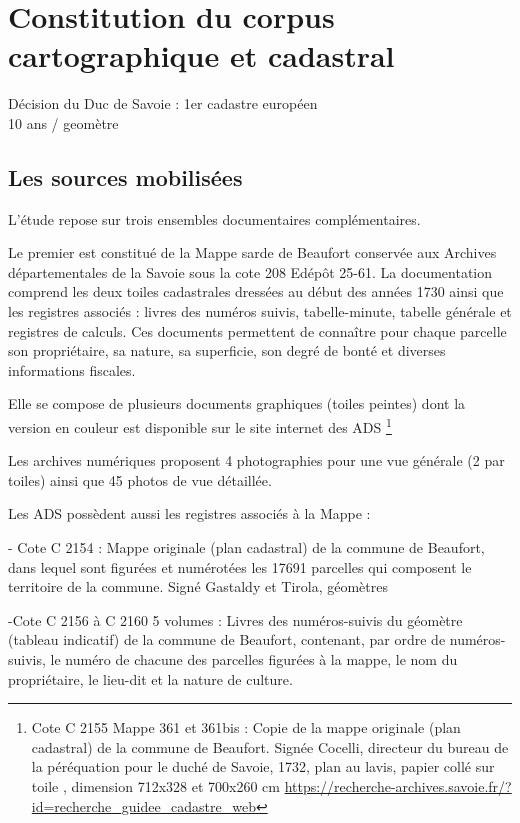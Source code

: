 \documentclass[12pt,a4paper]{report}
\begin{document}
	
\chapter{Constitution du corpus cartographique et cadastral}

Décision du Duc de Savoie : 1er cadastre européen\\
10 ans / geomètre\\

\section{Les sources mobilisées}

L'étude repose sur trois ensembles documentaires complémentaires.

Le premier est constitué de la Mappe sarde de Beaufort conservée aux Archives départementales de la Savoie sous la cote 208 Edépôt 25-61. La documentation comprend les deux toiles cadastrales dressées au début des années 1730 ainsi que les registres associés : livres des numéros suivis, tabelle-minute, tabelle générale et registres de calculs. Ces documents permettent de connaître pour chaque parcelle son propriétaire, sa nature, sa superficie, son degré de bonté et diverses informations fiscales.

Elle se compose de plusieurs documents graphiques (toiles peintes) dont la version en couleur est disponible sur le site internet des ADS \footnote{Cote C 2155 Mappe 361 et 361bis : Copie de la mappe originale (plan cadastral) de la commune de Beaufort. Signée Cocelli, directeur du bureau de la péréquation pour le duché de Savoie, 1732, plan au lavis, papier collé sur toile , dimension 712x328 et 700x260 cm \url{https://recherche-archives.savoie.fr/?id=recherche_guidee_cadastre_web}}

Les archives numériques proposent 4 photographies pour une vue générale (2 par toiles) ainsi que 45 photos de vue détaillée.

Les ADS possèdent aussi les registres associés à la Mappe : 

- Cote C 2154 : Mappe originale (plan cadastral) de la commune de Beaufort, dans lequel sont figurées et numérotées les 17691 parcelles qui composent le territoire de la commune. Signé Gastaldy et Tirola, géomètres

-Cote C 2156 à C 2160 5 volumes : Livres des numéros-suivis du géomètre (tableau indicatif) de la commune de Beaufort, contenant, par ordre de numéros-suivis, le numéro de chacune des parcelles figurées à la mappe, le nom du propriétaire, le lieu-dit et la nature de culture. 
\end{document}
